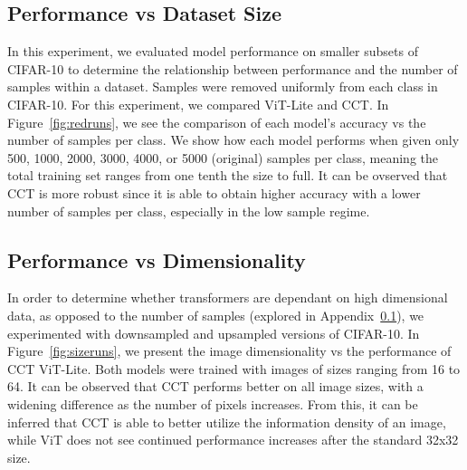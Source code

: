 \documentclass[10pt,twocolumn,letterpaper]{article}
\begin{document}
\subsection{Performance vs Dataset Size}
\label{appdx:performance-vs-dataset}

In this experiment, we evaluated model performance on smaller subsets of CIFAR-10 to determine the relationship between performance and the number of samples within a dataset.
Samples were removed uniformly from each class in CIFAR-10. For this experiment, we compared ViT-Lite and CCT.
In Figure~\ref{fig:redruns}, we see the comparison of each model's accuracy vs the number of samples per class.
We show how each model performs when given only 500, 1000, 2000, 3000, 4000, or 5000 (original) samples per class, meaning the total training set ranges from one tenth the size to full.
It can be ovserved that CCT is more robust since it is able to obtain higher accuracy with a lower number of samples per class, especially in the low sample regime.

\subsection{Performance vs Dimensionality}
\label{appdx:performance-vs-dimensionality}
In order to determine whether transformers are dependant on high dimensional data, as opposed to the number of samples (explored in Appendix~\ref{appdx:performance-vs-dataset}), we experimented with downsampled and upsampled versions of CIFAR-10.
In Figure~\ref{fig:sizeruns}, we present the image dimensionality vs the performance of CCT \vs ViT-Lite. Both models were trained with images of sizes ranging from 16 to 64.
It can be observed that CCT performs better on all image sizes, with a widening difference as the number of pixels increases.
From this, it can be inferred that CCT is able to better utilize the information density of an image, while ViT does not see continued performance increases after the standard 32x32 size.
\end{document}
